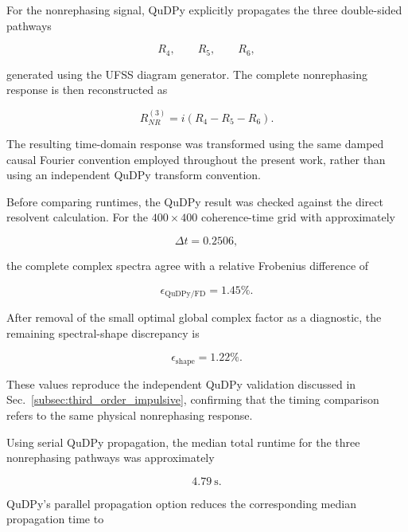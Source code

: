 \documentclass[11pt]{article}
\begin{document}
For the nonrephasing signal, QuDPy explicitly propagates the three
double-sided pathways

\begin{equation}
R_4,
\qquad
R_5,
\qquad
R_6,
\end{equation}

generated using the UFSS diagram generator.  The complete
nonrephasing response is then reconstructed as

\begin{equation}
R_{NR}^{(3)}
=
i
\left(
R_4-R_5-R_6
\right).
\end{equation}

The resulting time-domain response was transformed using the same
damped causal Fourier convention employed throughout the present
work, rather than using an independent QuDPy transform convention.

Before comparing runtimes, the QuDPy result was checked against the
direct resolvent calculation.  For the $400\times400$ coherence-time
grid with approximately

\begin{equation}
\Delta t
=
0.2506,
\end{equation}

the complete complex spectra agree with a relative Frobenius
difference of

\begin{equation}
\boxed{
\epsilon_{\mathrm{QuDPy/FD}}
=
1.45\%.
}
\end{equation}

After removal of the small optimal global complex factor as a
diagnostic, the remaining spectral-shape discrepancy is

\begin{equation}
\boxed{
\epsilon_{\mathrm{shape}}
=
1.22\%.
}
\end{equation}

These values reproduce the independent QuDPy validation discussed in
Sec.~\ref{subsec:third_order_impulsive}, confirming that the timing
comparison refers to the same physical nonrephasing response.

Using serial QuDPy propagation, the median total runtime for the three
nonrephasing pathways was approximately

\begin{equation}
4.79\ \mathrm{s}.
\end{equation}

QuDPy's parallel propagation option reduces the corresponding median
propagation time to
\end{document}
